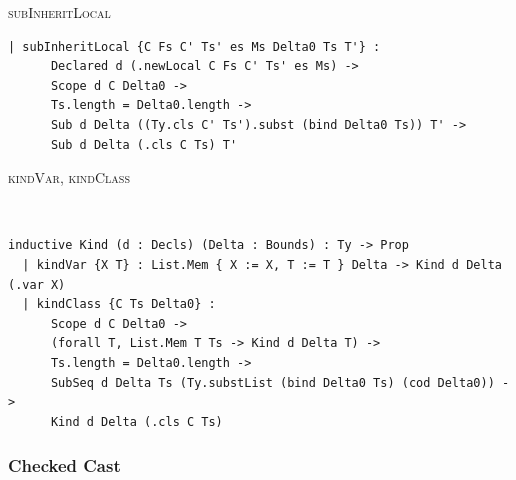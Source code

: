 \begin{cmp}{\textsc{subInheritLocal}}
\begin{paperside}
\end{paperside}
\begin{leanside}
\begin{lstlisting}[style=leanside]
  | subInheritLocal {C Fs C' Ts' es Ms Delta0 Ts T'} :
      Declared d (.newLocal C Fs C' Ts' es Ms) ->
      Scope d C Delta0 ->
      Ts.length = Delta0.length ->
      Sub d Delta ((Ty.cls C' Ts').subst (bind Delta0 Ts)) T' ->
      Sub d Delta (.cls C Ts) T'
\end{lstlisting}
\end{leanside}
\nomapping
\end{cmp}

\begin{cmp}{\textsc{kindVar}, \textsc{kindClass}}
\begin{paperside}
\\[1ex]
\end{paperside}
\begin{leanside}
\begin{lstlisting}[style=leanside]
inductive Kind (d : Decls) (Delta : Bounds) : Ty -> Prop
  | kindVar {X T} : List.Mem { X := X, T := T } Delta -> Kind d Delta (.var X)
  | kindClass {C Ts Delta0} :
      Scope d C Delta0 ->
      (forall T, List.Mem T Ts -> Kind d Delta T) ->
      Ts.length = Delta0.length ->
      SubSeq d Delta Ts (Ty.substList (bind Delta0 Ts) (cod Delta0)) ->
      Kind d Delta (.cls C Ts)
\end{lstlisting}
\end{leanside}
\nomapping
\end{cmp}

\subsubsection{Checked Cast}

